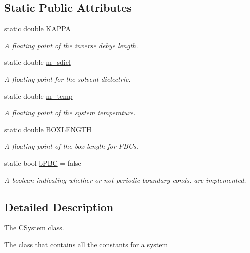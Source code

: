 \subsection*{Static Public Attributes}
\begin{DoxyCompactItemize}
\item 
static double \hyperlink{classCSystem_a26c3b08c72081eee05d8dd12010860de}{K\-A\-P\-P\-A}
\begin{DoxyCompactList}\small\item\em A floating point of the inverse debye length. \end{DoxyCompactList}\item 
static double \hyperlink{classCSystem_a759e213e8fc55da6be14382b90864e06}{m\-\_\-sdiel}
\begin{DoxyCompactList}\small\item\em A floating point for the solvent dielectric. \end{DoxyCompactList}\item 
static double \hyperlink{classCSystem_aa6fbb1e26af0341048dbdc26e6e44b44}{m\-\_\-temp}
\begin{DoxyCompactList}\small\item\em A floating point of the system temperature. \end{DoxyCompactList}\item 
static double \hyperlink{classCSystem_a59f4db8047443eac01a56ff40c7d1592}{B\-O\-X\-L\-E\-N\-G\-T\-H}
\begin{DoxyCompactList}\small\item\em A floating point of the box length for P\-B\-Cs. \end{DoxyCompactList}\item 
static bool \hyperlink{classCSystem_ad4220c7ae13d01939b760aa998afe9f0}{b\-P\-B\-C} = false
\begin{DoxyCompactList}\small\item\em A boolean indicating whether or not periodic boundary conds. are implemented. \end{DoxyCompactList}\end{DoxyCompactItemize}


\subsection{Detailed Description}
The \hyperlink{classCSystem}{C\-System} class. 

The class that contains all the constants for a system 

